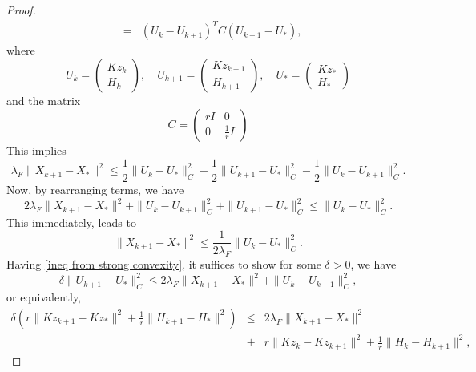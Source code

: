 \begin{itemize}
\begin{proof}
\begin{eqnarray*}
&=& (U_{k} - U_{k+1})^T C (U_{k+1} - U_*),  
\end{eqnarray*}
where 
\begin{equation}
U_k = \begin{pmatrix} 
      Kz_k \\
      H_k 
      \end{pmatrix}, \quad U_{k+1} = \begin{pmatrix} 
      Kz_{k+1} \\
      H_{k+1}  
      \end{pmatrix}
,\quad U_{*} = \begin{pmatrix} 
      Kz_{*} \\
      H_{*}  
      \end{pmatrix}
\end{equation}
and the matrix 
\begin{equation}
    C = \begin{pmatrix}
r I & 0 \\
0 &  \frac{1}{r} I
\end{pmatrix}
\end{equation}
This implies
\begin{equation}
\lambda_F  \| X_{k+1} - X_* \|^2 \leq  \frac{1}{2} \|U_k - U_* \|^2_C - \frac{1}{2}  \|U_{k+1} - U_*\|^2_C -  \frac{1}{2}  \|U_k - U_{k+1}\|^2_C. 
\end{equation}
Now, by rearranging terms, we have 
\begin{equation}\label{ineq from strong convexity}
2\lambda_F \| X_{k+1} - X_* \|^2 + \|U_k - U_{k+1}\|^2_C + \|U_{k+1} - U_*\|^2_C \leq  \|U_k - U_* \|^2_C.
\end{equation}
This immediately, leads to 
\begin{equation}
\|X_{k+1} - X_* \|^2 \leq \frac{1}{2 \lambda_F} \|U_{k} - U_*\|^2_C.
\end{equation}
Having \eqref{ineq from strong convexity}, it suffices to show for some $\delta > 0$, we have 
\begin{equation}\label{claim}
\delta \|U_{k+1} - U_* \|^2_C \leq 2 \lambda_F \|X_{k+1} - X_* \|^2 + \|U_k - U_{k+1}\|^2_C,
\end{equation}
or equivalently,
\begin{eqnarray*}\label{claimequivalence}
\delta \left( r  \|Kz_{k+1}- Kz_{*} \|^2 + \frac{1}{r} \|H_{k+1} - H_{*} \|^2 \right) &\leq&  2 \lambda_F \|X_{k+1} - X_* \|^2 \\
&+& r \|Kz_{k}- Kz_{k+1} \|^2 + \frac{1}{r} \|H_k - H_{k+1} \|^2, 
\end{eqnarray*}

\end{proof}
\end{itemize}
